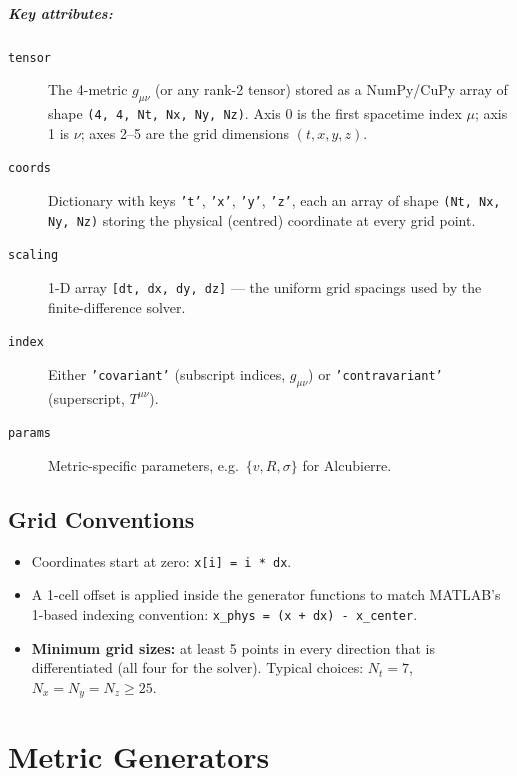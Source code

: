 \documentclass[11pt, a4paper, twoside]{report}
\begin{document}
\paragraph{Key attributes:}
\begin{description}
  \item[\texttt{tensor}]
    The 4-metric $g_{\mu\nu}$ (or any rank-2 tensor) stored as a
    NumPy/CuPy array of shape \texttt{(4, 4, Nt, Nx, Ny, Nz)}.
    Axis 0 is the first spacetime index $\mu$; axis 1 is $\nu$;
    axes 2--5 are the grid dimensions $(t, x, y, z)$.

  \item[\texttt{coords}]
    Dictionary with keys \texttt{'t'}, \texttt{'x'}, \texttt{'y'},
    \texttt{'z'}, each an array of shape \texttt{(Nt, Nx, Ny, Nz)}
    storing the physical (centred) coordinate at every grid point.

  \item[\texttt{scaling}]
    1-D array \texttt{[dt, dx, dy, dz]} — the uniform grid spacings
    used by the finite-difference solver.

  \item[\texttt{index}]
    Either \texttt{'covariant'} (subscript indices, $g_{\mu\nu}$)
    or \texttt{'contravariant'} (superscript, $T^{\mu\nu}$).

  \item[\texttt{params}]
    Metric-specific parameters, e.g.\
    $\{v, R, \sigma\}$ for Alcubierre.
\end{description}

\section{Grid Conventions}

\begin{itemize}
  \item Coordinates start at zero: \texttt{x[i] = i * dx}.
  \item A 1-cell offset is applied inside the generator functions to
        match MATLAB's 1-based indexing convention:
        \texttt{x\_phys = (x + dx) - x\_center}.
  \item \textbf{Minimum grid sizes:} at least 5 points in every
        direction that is differentiated (all four for the solver).
        Typical choices: $N_t = 7$, $N_x = N_y = N_z \ge 25$.
\end{itemize}

\chapter{Metric Generators}
\label{chap:generators}
\end{document}
